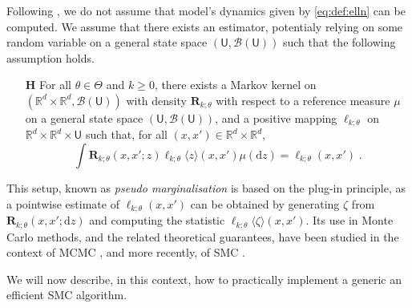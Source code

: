 \documentclass{article}
\def\Xset{\mathbb{R}^d}
\newcommand{\md}[1]{g_{#1}}
\newcommand{\parvec}{\theta}
\newcommand{\parspace}{\Theta}
\newcommand{\hd}[1]{q_{#1}}
\newcommand{\rmd}{\ensuremath{\mathrm{d}}}
\newcommand{\eqsp}{\;}
\newcounter{hypH}
\newenvironment{hypH}{\refstepcounter{hypH}\begin{itemize}
\item[{\bf H\arabic{hypH}}]}{\end{itemize}}
\newcommand{\marginalset}{\mathsf{U}}
\newcommand{\kernelmarg}{\mathbf{R}}
\newcommand{\qg}[1]{\ell_{#1}}
\newcommand{\hatqg}[1]{\mathsf{\ell}_{#1}}
\begin{document}
Following \cite{fearnhead2008particle, olsson2011particle, gloaguen2018online, gloaguen2019pseudo}, we do not assume that model's dynamics given by \eqref{eq:def:elln} can be computed.
We assume that there exists an estimator, potentialy relying on some random variable on a general state space $(\marginalset,\mathcal{B}(\marginalset))$ such that the following assumption holds.
\begin{hypH} 
\label{assum:unbiased}
For all $\parvec \in\parspace$ and $k\geqslant 0$, there exists a Markov kernel on $(\Xset\times\Xset,\mathcal{B}(\marginalset))$ with density $\kernelmarg_{k;\parvec}$ with respect to a reference measure $\mu$ on a general state space $(\marginalset,\mathcal{B}(\marginalset))$,  and a positive mapping $\hatqg{k;\parvec}$ on $\Xset\times\Xset\times\marginalset$ such that, for all $(x,x')\in\Xset \times \Xset$,
\begin{equation*}
\int \kernelmarg_{k;\parvec}(x,x';z)\hatqg{k;\parvec}\langle z\rangle(x,x')\mu(\rmd z) =  \qg{k;\parvec}(x,x')\eqsp.
\end{equation*}
\end{hypH}
This setup, known as \textit{pseudo marginalisation} is based on the plug-in principle, as a pointwise estimate of $\qg{k;\parvec}(x,x')$ can be obtained by generating $\zeta$ from $\kernelmarg_{k;\parvec}(x,x';\rmd z)$ and computing the statistic $\hatqg{k;\parvec}\langle \zeta\rangle(x,x')$. 
Its use in Monte Carlo methods, and the related theoretical guarantees, have been studied in the context of MCMC \cite{andrieu2009pseudo}, and more recently, of SMC \cite{gloaguen2019pseudo}.

We will now describe, in this context, how to practically implement a generic an efficient SMC algorithm.
\end{document}
